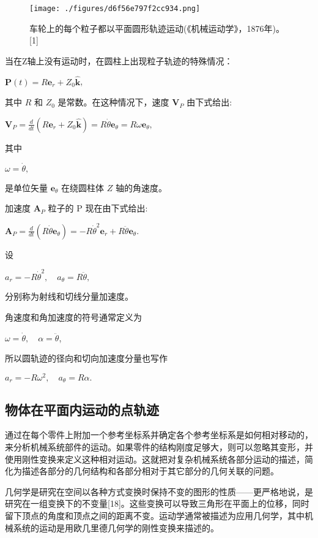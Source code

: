 \begin{figure}[ht]
\centering
\texttt{[image: ./figures/d6f56e797f2cc934.png]}
\caption{车轮上的每个粒子都以平面圆形轨迹运动(《机械运动学》，1876年)。[1]} \label{fig_YDX_10}
\end{figure}

当在Z轴上没有运动时，在圆柱上出现粒子轨迹的特殊情况：

$\mathbf{P}(t) = R \mathbf{e}_r + Z_0 \mathbf{\hat{k}}$,

其中 $R$ 和 $Z_0$ 是常数。在这种情况下，速度 $\mathbf{V}_P$ 由下式给出:

$\mathbf{V}_P = \frac{d}{dt}(R \mathbf{e}_r + Z_0 \mathbf{\hat{k}}) = R \dot{\theta} \mathbf{e}_{\theta} = R \omega \mathbf{e}_{\theta},$

其中

$\omega = \dot{\theta},$

是单位矢量 $\mathbf{e}_{\theta}$ 在绕圆柱体 $Z$ 轴的角速度。

加速度 $\mathbf{A}_P$ 粒子的 P 现在由下式给出:

$\mathbf{A}_P = \frac{d}{dt}(R \dot{\theta} \mathbf{e}_{\theta}) = -R \dot{\theta}^2 \mathbf{e}_r + R \ddot{\theta} \mathbf{e}_{\theta}.$

设

$a_r = -R \dot{\theta}^2, \quad a_{\theta} = R \ddot{\theta},$

分别称为射线和切线分量加速度。

角速度和角加速度的符号通常定义为

$\omega = \dot{\theta}, \quad \alpha = \ddot{\theta}$,

所以圆轨迹的径向和切向加速度分量也写作

$a_r = -R \omega^2, \quad a_{\theta} = R \alpha.$

\subsection{物体在平面内运动的点轨迹}

通过在每个零件上附加一个参考坐标系并确定各个参考坐标系是如何相对移动的，来分析机械系统部件的运动。如果零件的结构刚度足够大，则可以忽略其变形，并使用刚性变换来定义这种相对运动。这就把对复杂机械系统各部分运动的描述，简化为描述各部分的几何结构和各部分相对于其它部分的几何关联的问题。

几何学是研究在空间以各种方式变换时保持不变的图形的性质——更严格地说，是研究在一组变换下的不变量[18]。这些变换可以导致三角形在平面上的位移，同时留下顶点的角度和顶点之间的距离不变。运动学通常被描述为应用几何学，其中机械系统的运动是用欧几里德几何学的刚性变换来描述的。

